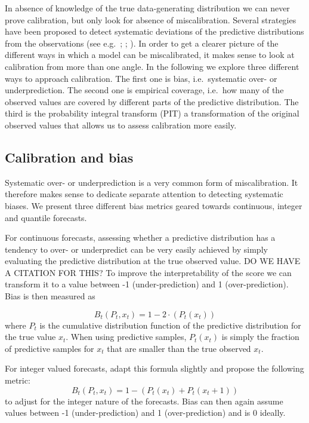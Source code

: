\documentclass[
]{book}
\begin{document}
In absence of knowledge of the true data-generating distribution we can never prove calibration, but only look for absence of miscalibration. Several strategies have been proposed to detect systematic deviations of the predictive distributions from the observations (see e.g.~\citet{funkAssessingPerformanceRealtime2019}; \citet{gneitingProbabilisticForecastsCalibration2007}; \citet{gneitingStrictlyProperScoring2007}). In order to get a clearer picture of the different ways in which a model can be miscalibrated, it makes sense to look at calibration from more than one angle. In the following we explore three different ways to approach calibration. The first one is bias, i.e.~systematic over- or underprediction. The second one is empirical coverage, i.e.~how many of the observed values are covered by different parts of the predictive distribution. The third is the probability integral transform (PIT) a transformation of the original observed values that allows us to assess calibration more easily.

\hypertarget{calibration-and-bias}{%
\subsection{Calibration and bias}\label{calibration-and-bias}}

Systematic over- or underprediction is a very common form of miscalibration. It therefore makes sense to dedicate separate attention to detecting systematic biases. We present three different bias metrics geared towards continuous, integer and quantile forecasts.

For continuous forecasts, assessing whether a predictive distribution has a tendency to over- or underpredict can be very easily achieved by simply evaluating the predictive distribution at the true observed value. DO WE HAVE A CITATION FOR THIS? To improve the interpretability of the score we can transform it to a value between -1 (under-prediction) and 1 (over-prediction). Bias is then measured as

\[B_t (P_t, x_t) = 1 - 2 \cdot (P_t (x_t))\]
where \(P_t\) is the cumulative distribution function of the predictive distribution for the true value \(x_t\). When using predictive samples, \(P_t (x_t)\) is simply the fraction of predictive samples for \(x_t\) that are smaller than the true observed \(x_t\).

For integer valued forecasts, \citep{funkAssessingPerformanceRealtime2019} adapt this formula slightly and propose the following metric:
\[B_t (P_t, x_t) = 1 - (P_t (x_t) + P_t (x_t + 1))\]
to adjust for the integer nature of the forecasts. Bias can then again assume values between -1 (under-prediction) and 1 (over-prediction) and is 0 ideally.
\end{document}
